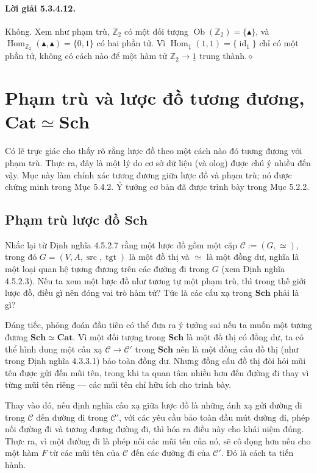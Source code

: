 \paragraph{Lời giải 5.3.4.12.} Không. Xem như phạm trù, $\mathbb Z_2$ có một đối tượng $\operatorname{Ob}(\mathbb Z_2)=\{\blacktriangle\}$, và $\operatorname{Hom}_{\mathbb Z_2}(\blacktriangle,\blacktriangle)=\{0,1\}$ có hai phần tử. Vì $\operatorname{Hom}_{\underline{1}}(1,1)=\{\operatorname{id}_1\}$ chỉ có một phần tử, không có cách nào để một hàm tử $\mathbb Z_2\to\underline{1}$ trung thành.\hfill$\diamond$
\section{Phạm trù và lược đồ tương đương, \texorpdfstring{$\mathbf{Cat}\simeq\mathbf{Sch}$}{Cat tương đương Sch}}
Có lẽ trực giác cho thấy rõ rằng lược đồ theo một cách nào đó tương đương với phạm trù. Thực ra, đây là một lý do cơ sở dữ liệu (và olog) được chú ý nhiều đến vậy. Mục này làm chính xác tương đương giữa lược đồ và phạm trù; nó được chứng minh trong Mục 5.4.2. Ý tưởng cơ bản đã được trình bày trong Mục 5.2.2.
\subsection{Phạm trù lược đồ \texorpdfstring{$\mathbf{Sch}$}{Sch}}
Nhắc lại từ Định nghĩa 4.5.2.7 rằng một lược đồ gồm một cặp $\mathcal C:=(G,\simeq)$, trong đó $G=(V,A,\operatorname{src},\operatorname{tgt})$ là một đồ thị và $\simeq$ là một đồng dư, nghĩa là một loại quan hệ tương đương trên các đường đi trong $G$ (xem Định nghĩa 4.5.2.3). Nếu ta xem một lược đồ như tương tự một phạm trù, thì trong thế giới lược đồ, điều gì nên đóng vai trò hàm tử? Tức là các cấu xạ trong $\mathbf{Sch}$ phải là gì?

Đáng tiếc, phỏng đoán đầu tiên có thể đưa ra ý tưởng sai nếu ta muốn một tương đương $\mathbf{Sch}\simeq\mathbf{Cat}$. Vì một đối tượng trong $\mathbf{Sch}$ là một đồ thị có đồng dư, ta có thể hình dung một cấu xạ $\mathcal C\to\mathcal C'$ trong $\mathbf{Sch}$ nên là một đồng cấu đồ thị (như trong Định nghĩa 4.3.3.1) bảo toàn đồng dư. Nhưng đồng cấu đồ thị đòi hỏi mũi tên được gửi đến mũi tên, trong khi ta quan tâm nhiều hơn đến đường đi thay vì từng mũi tên riêng --- các mũi tên chỉ hữu ích cho trình bày.

Thay vào đó, nếu định nghĩa cấu xạ giữa lược đồ là những ánh xạ gửi đường đi trong $\mathcal C$ đến đường đi trong $\mathcal C'$, với các yêu cầu bảo toàn đầu mút đường đi, phép nối đường đi và tương đương đường đi, thì hóa ra điều này cho khái niệm đúng. Thực ra, vì một đường đi là phép nối các mũi tên của nó, sẽ cô đọng hơn nếu cho một hàm $F$ từ các mũi tên của $\mathcal C$ đến các đường đi của $\mathcal C'$. Đó là cách ta tiến hành.

